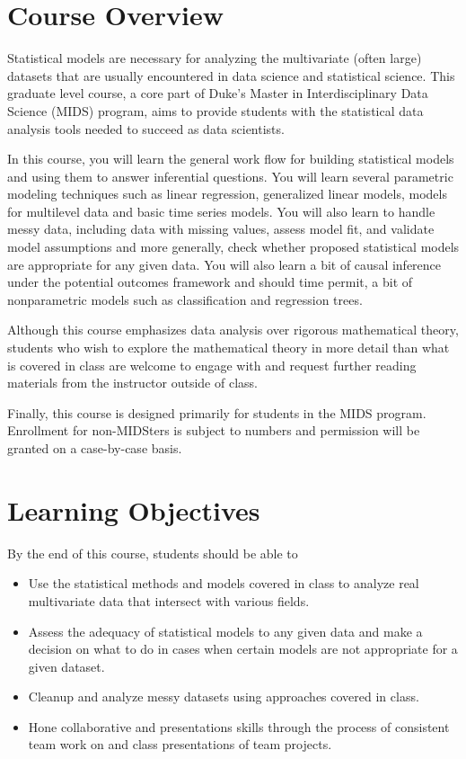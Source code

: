\documentclass[11pt, a4paper]{article}
\begin{document}
\section{Course Overview}
Statistical models are necessary for analyzing the multivariate (often large) datasets that are usually encountered in data science and statistical science. This graduate level course, a core part of Duke's Master in Interdisciplinary Data Science (MIDS) program, aims to provide students with the statistical data analysis tools needed to succeed as data scientists. 

In this course, you will learn the general work flow for building statistical models and using them to answer inferential questions. You will learn several parametric modeling techniques such as linear regression, generalized linear models, models for multilevel data and basic time series models. You will also learn to handle messy data, including data with missing values, assess model fit, and validate model assumptions and more generally, check whether proposed statistical models are appropriate for any given data. You will also learn a bit of causal inference under the potential outcomes framework and should time permit, a bit of nonparametric models such as classification and regression trees. 

Although this course emphasizes data analysis over rigorous mathematical theory, students who wish to explore the mathematical theory in more detail than what is covered in class are welcome to engage with and request further reading materials from the instructor outside of class.

Finally, this course is designed primarily for students in the MIDS program. Enrollment for non-MIDSters is subject to numbers and permission will be granted on a case-by-case basis.

\section{Learning Objectives}
By the end of this course, students should be able to
\begin{itemize}[label= {\color{darkblue}{\ArrowBoldRightStrobe}}]
	\item Use the statistical methods and models covered in class to analyze real multivariate data that intersect with various fields. 
	\item Assess the adequacy of statistical models to any given data and make a decision on what to do in cases when certain models are not appropriate for a given dataset.
	\item Cleanup and analyze messy datasets using approaches covered in class.
	\item Hone collaborative and presentations skills through the process of consistent team work on and class presentations of team projects.
\end{itemize}
\end{document}
